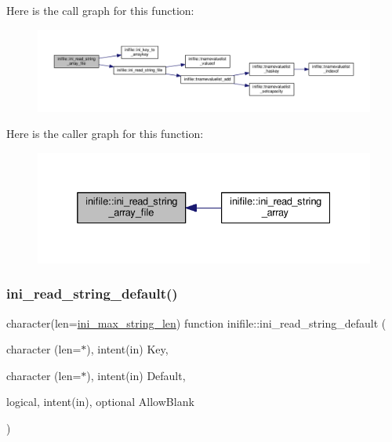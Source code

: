 Here is the call graph for this function\+:
\nopagebreak
\begin{figure}[H]
\begin{center}
\leavevmode
\includegraphics[width=350pt]{namespaceinifile_a99383bb07cc01af1876a178e4c55a8e5_cgraph}
\end{center}
\end{figure}
Here is the caller graph for this function\+:
\nopagebreak
\begin{figure}[H]
\begin{center}
\leavevmode
\includegraphics[width=332pt]{namespaceinifile_a99383bb07cc01af1876a178e4c55a8e5_icgraph}
\end{center}
\end{figure}
\mbox{\label{namespaceinifile_aa7ae8cf26934154dd70639ba1ed9d541}} 
\subsubsection{\texorpdfstring{ini\+\_\+read\+\_\+string\+\_\+default()}{ini\_read\_string\_default()}}
{\footnotesize\ttfamily character(len=\mbox{\hyperlink{namespaceinifile_a32faebf83b580d14b5af965dcb4eebfd}{ini\+\_\+max\+\_\+string\+\_\+len}}) function inifile\+::ini\+\_\+read\+\_\+string\+\_\+default (\begin{DoxyParamCaption}\item[{character (len=$\ast$), intent(in)}]{Key,  }\item[{character (len=$\ast$), intent(in)}]{Default,  }\item[{logical, intent(in), optional}]{Allow\+Blank }\end{DoxyParamCaption})}



